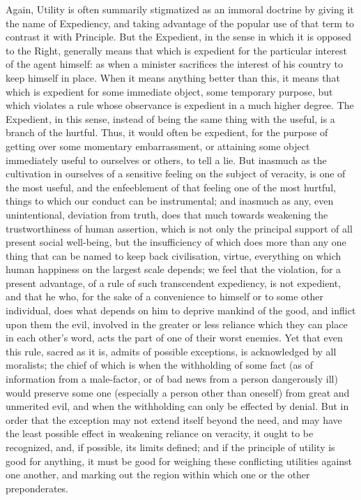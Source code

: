 \documentclass[12pt]{report}
\begin{document}
Again, Utility is often summarily stigmatized as an immoral doctrine by giving it the name of Expediency, and taking advantage of the popular use of that term to contrast it with Principle. But the Expedient, in the sense in which it is opposed to the Right, generally means that which is expedient for the particular interest of the agent himself: as when a minister sacrifices the interest of his country to keep himself in place. When it means anything better than this, it means that which is expedient for some immediate object, some temporary purpose, but which violates a rule whose observance is expedient in a much higher degree. The Expedient, in this sense, instead of being the same thing with the useful, is a branch of the hurtful. Thus, it would often be expedient, for the purpose of getting over some momentary embarrassment, or attaining some object immediately useful to ourselves or others, to tell a lie. But inasmuch as the cultivation in ourselves of a sensitive feeling on the subject of veracity, is one of the most useful, and the enfeeblement of that feeling one of the most hurtful, things to which our conduct can be instrumental; and inasmuch as any, even unintentional, deviation from truth, does that much towards weakening the trustworthiness of human assertion, which is not only the principal support of all present social well-being, but the insufficiency of which does more than any one thing that can be named to keep back civilisation, virtue, everything on which human happiness on the largest scale depends; we feel that the violation, for a present advantage, of a rule of such transcendent expediency, is not expedient, and that he who, for the sake of a convenience to himself or to some other individual, does what depends on him to deprive mankind of the good, and inflict upon them the evil, involved in the greater or less reliance which they can place in each other's word, acts the part of one of their worst enemies. Yet that even this rule, sacred as it is, admits of possible exceptions, is acknowledged by all moralists; the chief of which is when the withholding of some fact (as of information from a male-factor, or of bad news from a person dangerously ill) would preserve some one (especially a person other than oneself) from great and unmerited evil, and when the withholding can only be effected by denial. But in order that the exception may not extend itself beyond the need, and may have the least possible effect in weakening reliance on veracity, it ought to be recognized, and, if possible, its limits defined; and if the principle of utility is good for anything, it must be good for weighing these conflicting utilities against one another, and marking out the region within which one or the other preponderates.
\end{document}
